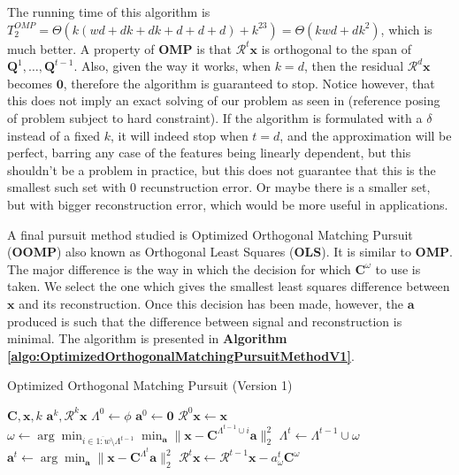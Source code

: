 \documentclass[12pt,a4paper,oneside,english]{UPBThesis}
\newcommand{\hcrange}[2]{\overline{{#1}\colon\!\!{#2}}}
\begin{document}
The running time of this algorithm is $T_2^{OMP} = \Theta(k(wd + dk + dk + d + d + d) + k^23) = \Theta(kwd + dk^2)$, which is much better. A property of \textbf{OMP} is that $\mathcal{R}^t\textbf{x}$ is orthogonal to the span of $\textbf{Q}^1,\dots,\textbf{Q}^{t-1}$. Also, given the way it works, when $k = d$, then the residual $\mathcal{R}^d\textbf{x}$ becomes $\textbf{0}$, therefore the algorithm is guaranteed to stop. Notice however, that this does not imply an exact solving of our problem as seen in (reference posing of problem subject to hard constraint). If the algorithm is formulated with a $\delta$ instead of a fixed $k$, it will indeed stop when $t = d$, and the approximation will be perfect, barring any case of the features being linearly dependent, but this shouldn't be a problem in practice, but this does not guarantee that this is the smallest such set with $0$ recunstruction error. Or maybe there is a smaller set, but with bigger reconstruction error, which would be more useful in applications.

A final pursuit method studied is Optimized Orthogonal Matching Pursuit (\textbf{OOMP}) also known as Orthogonal Least Squares (\textbf{OLS}). It is similar to \textbf{OMP}. The major difference is the way in which the decision for which $\textbf{C}^\omega$ to use is taken. We select the one which gives the smallest least squares difference between $\textbf{x}$ and its reconstruction. Once this decision has been made, however, the $\textbf{a}$ produced is such that the difference between signal and reconstruction is minimal. The algorithm is presented in \textbf{Algorithm \ref{algo:OptimizedOrthogonalMatchingPursuitMethodV1}}.

\begin{algorithm}
\caption{Optimized Orthogonal Matching Pursuit (Version 1)}
\label{algo:OptimizedOrthogonalMatchingPursuitMethodV1}
\begin{algorithmic}
\Require $\textbf{C},\textbf{x},k$
\Ensure $\textbf{a}^k,\mathcal{R}^k\textbf{x}$
\State $\Lambda^0 \gets \phi$
\State $\textbf{a}^0 \gets \textbf{0}$
\State $\mathcal{R}^0\textbf{x} \gets \textbf{x}$
\For {$t = \hcrange{1}{k}$}
\State $\omega \gets \arg \min_{i \in \hcrange{1}{w} \setminus \Lambda^{t-1}} \min_{\textbf{a}} {\| \textbf{x} - \textbf{C}^{\Lambda^{t-1} \cup i}\textbf{a} \|_2^2}$
\State $\Lambda^t \gets \Lambda^{t-1} \cup \omega$
\State $\textbf{a}^t \gets \arg\min_{\textbf{a}} {\| \textbf{x} - \textbf{C}^{\Lambda^t}\textbf{a} \|_2^2}$
\State $\mathcal{R}^t\textbf{x} \gets \mathcal{R}^{t-1}\textbf{x} - a_\omega^t\textbf{C}^\omega$
\EndFor
\end{algorithmic}
\end{algorithm}
\end{document}
